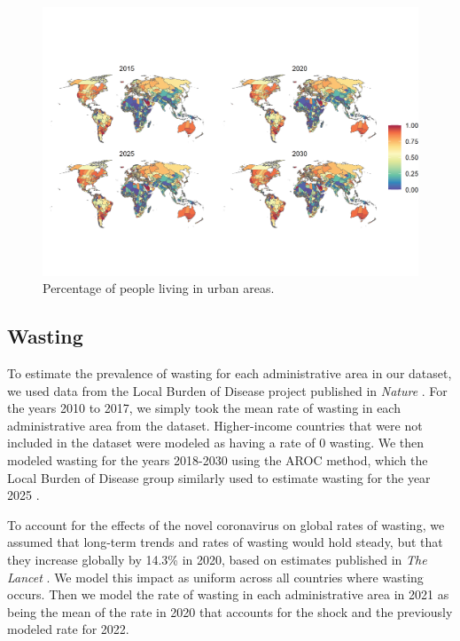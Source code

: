 \documentclass{article}
\begin{document}
\begin{figure}[H]
  \centering
  \includegraphics[width=\linewidth]{img/covars/urban_perc.png}
  \caption{Percentage of people living in urban areas.}
\end{figure}

\subsection{Wasting}
To estimate the prevalence of wasting for each administrative area in our dataset, we used data from the Local Burden of Disease project published in \textit{Nature} \citep{Local2020}.  For the years 2010 to 2017, we simply took the mean rate of wasting in each administrative area from the dataset.  Higher-income countries that were not included in the dataset were modeled as having a rate of 0 wasting.  We then modeled wasting for the years 2018-2030 using the AROC method, which the Local Burden of Disease group similarly used to estimate wasting for the year 2025 \citep{Local2020}.

To account for the effects of the novel coronavirus on global rates of wasting, we assumed that long-term trends and rates of wasting would hold steady, but that they increase globally by 14.3\% in 2020, based on estimates published in \textit{The Lancet} \citep{headey2020impacts}.  We model this impact as uniform across all countries where wasting occurs.  Then we model the rate of wasting in each administrative area in 2021 as being the mean of the rate in 2020 that accounts for the shock and the previously modeled rate for 2022.
\end{document}
